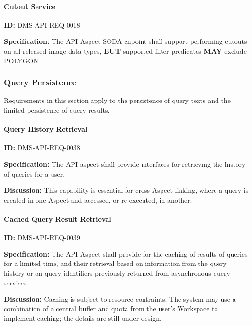 \documentclass[SE,toc]{lsstdoc}
\begin{document}
\paragraph{Cutout Service}\hfill  %

\label{DMS-API-REQ-0018}
\textbf{ID:} DMS-API-REQ-0018

\textbf{Specification:}
The API Aspect SODA enpoint shall support performing cutouts on all released image data types, \textbf{BUT} supported filter predicates \textbf{MAY} exclude POLYGON

\subsubsection{Query Persistence}

Requirements in this section apply to the persistence of query texts and the limited persistence of query results.

\paragraph{Query History Retrieval}\hfill  %

\label{DMS-API-REQ-0038}
\textbf{ID:} DMS-API-REQ-0038

\textbf{Specification:}
The API aspect shall provide interfaces for retrieving the history of queries for a user.

\textbf{Discussion:}
This capability is essential for cross-Aspect linking, where a query is created in one Aspect and accessed, or re-executed, in another.

\paragraph{Cached Query Result Retrieval}\hfill  %

\label{DMS-API-REQ-0039}
\textbf{ID:} DMS-API-REQ-0039

\textbf{Specification:}
The API Aspect shall provide for the caching of results of queries for a limited time, and their retrieval based on information from the query history or on query identifiers previously returned from asynchronous query services.

\textbf{Discussion:}
Caching is subject to resource contraints.  The system may use a combination of a central buffer and quota from the user's Workspace to implement caching; the details are still under design.
\end{document}
